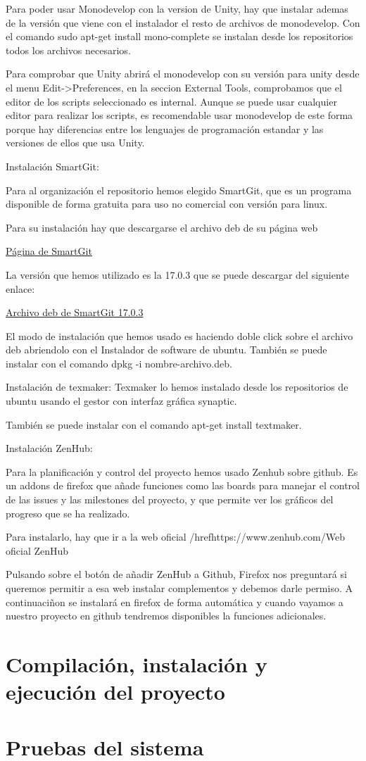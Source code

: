 Para poder usar Monodevelop con la version de Unity, hay que instalar ademas de la versión que viene con el instalador el resto de archivos de monodevelop. Con el comando sudo apt-get install mono-complete se instalan desde los repositorios todos los archivos necesarios.

Para comprobar que Unity abrirá el monodevelop con su versión para unity desde el menu Edit->Preferences, en la seccion External Tools, comprobamos que el editor de  los scripts seleccionado es internal. Aunque se puede usar cualquier editor para realizar los scripts, es recomendable usar monodevelop de este forma porque hay diferencias entre los lenguajes de programación estandar y las versiones de ellos que usa Unity.

Instalación SmartGit:

Para al organización el repositorio hemos elegido SmartGit, que es un programa disponible de forma gratuita para uso no comercial con versión para linux.

Para su instalación hay que descargarse el archivo deb de su página web

\href{https://www.syntevo.com/smartgit/download}{Página de SmartGit}

La versión que hemos utilizado es la 17.0.3 que se puede descargar del siguiente enlace:

\href{https://www.syntevo.com/smartgit/download?file=smartgit/smartgit-17_0_3.deb}{Archivo deb de SmartGit 17.0.3}

El modo de instalación que hemos usado es haciendo doble click sobre el archivo deb abriendolo con el Instalador de software de ubuntu. También se puede instalar con el comando dpkg -i nombre-archivo.deb.

Instalación de texmaker:
Texmaker lo hemos instalado desde los repositorios de ubuntu usando el gestor con interfaz gráfica synaptic.

También se puede instalar con el comando apt-get install textmaker.

Instalación ZenHub:

Para la planificación y control del proyecto hemos usado Zenhub sobre github. Es un addons de firefox que añade funciones como las boards para manejar el control de las issues y las milestones del proyecto, y que permite ver los gráficos del progreso que se ha realizado.

Para instalarlo, hay que ir a la web oficial
/href{https://www.zenhub.com/}{Web oficial ZenHub}

Pulsando sobre el botón de añadir ZenHub a Github, Firefox nos preguntará si queremos permitir a esa web instalar complementos y debemos darle permiso. A continuaciñon se instalará en firefox de forma automática y cuando vayamos a nuestro proyecto en github tendremos disponibles la funciones adicionales.

\section{Compilación, instalación y ejecución del proyecto}

\section{Pruebas del sistema}
